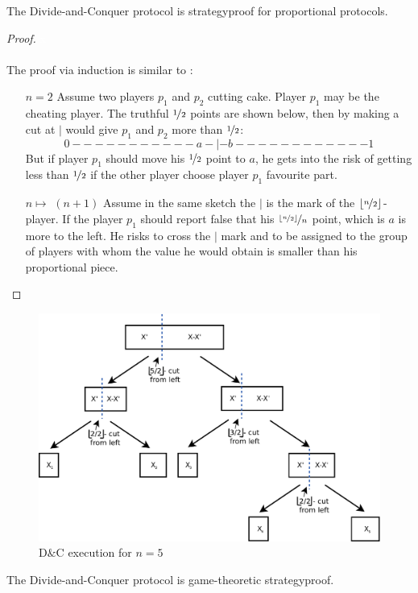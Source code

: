 \begin{lem}
\label{dc1}
The Divide-and-Conquer protocol is strategyproof for proportional protocols.
\end{lem}
\begin{proof} 
\textcolor{white}{x}\\\\
The proof via induction is similar to \cite{dc}:
\begin{itemize}
\item[$n=2$] Assume two players $p_1$ and $p_2$ cutting cake. Player $p_1$ may be the cheating player. The truthful $\nicefrac{1}{2}$ points are shown below, then by making a cut at $|$ would give $p_1$ and $p_2$ more than $\nicefrac{1}{2}$: 
$$0-----------a-|-b------------1$$ 
But if player $p_1$ should move his $\nicefrac{1}{2}$ point to $a$, he gets into the risk of
getting less than $\nicefrac{1}{2}$ if the other player choose player $p_1$ favourite part.
\item[$n \mapsto$]$(n+1)$ Assume in the same sketch the $|$ is the mark of the $\lfloor \nicefrac{n}{2} \rfloor$-player. If the player $p_1$ should report false that his $\nicefrac{\lfloor \nicefrac{n}{2} \rfloor}{n}$ point, which is $a$ is more to the left. He risks to cross the $|$ mark and to be assigned to the group of players with whom the value he would obtain is smaller than his proportional piece.
\end{itemize}
\end{proof}
\begin{figure}[h!]
		\centering
 		 \includegraphics[width=380pt]{bilder/dcbsp.pdf}
   \caption{D$\&$C execution for $n=5$}
  	 \end{figure}
  	 \newpage
\begin{lem}
\label{dc2}
The Divide-and-Conquer protocol is game-theoretic strategyproof.
\end{lem}
